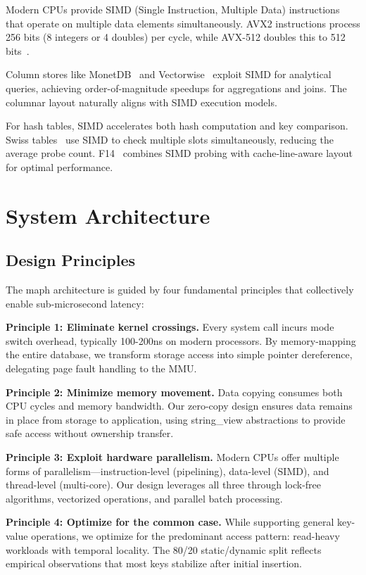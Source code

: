 \documentclass[10pt,conference]{IEEEtran}
\begin{document}
Modern CPUs provide SIMD (Single Instruction, Multiple Data) instructions that operate on multiple data elements simultaneously. AVX2 instructions process 256 bits (8 integers or 4 doubles) per cycle, while AVX-512 doubles this to 512 bits~\cite{simd-databases}.

Column stores like MonetDB~\cite{monetdb} and Vectorwise~\cite{vectorwise} exploit SIMD for analytical queries, achieving order-of-magnitude speedups for aggregations and joins. The columnar layout naturally aligns with SIMD execution models.

For hash tables, SIMD accelerates both hash computation and key comparison. Swiss tables~\cite{swisstables} use SIMD to check multiple slots simultaneously, reducing the average probe count. F14~\cite{f14} combines SIMD probing with cache-line-aware layout for optimal performance.

\section{System Architecture}
\label{sec:architecture}

\subsection{Design Principles}

The maph architecture is guided by four fundamental principles that collectively enable sub-microsecond latency:

\textbf{Principle 1: Eliminate kernel crossings.} Every system call incurs mode switch overhead, typically 100-200ns on modern processors. By memory-mapping the entire database, we transform storage access into simple pointer dereference, delegating page fault handling to the MMU.

\textbf{Principle 2: Minimize memory movement.} Data copying consumes both CPU cycles and memory bandwidth. Our zero-copy design ensures data remains in place from storage to application, using string\_view abstractions to provide safe access without ownership transfer.

\textbf{Principle 3: Exploit hardware parallelism.} Modern CPUs offer multiple forms of parallelism—instruction-level (pipelining), data-level (SIMD), and thread-level (multi-core). Our design leverages all three through lock-free algorithms, vectorized operations, and parallel batch processing.

\textbf{Principle 4: Optimize for the common case.} While supporting general key-value operations, we optimize for the predominant access pattern: read-heavy workloads with temporal locality. The 80/20 static/dynamic split reflects empirical observations that most keys stabilize after initial insertion.
\end{document}
